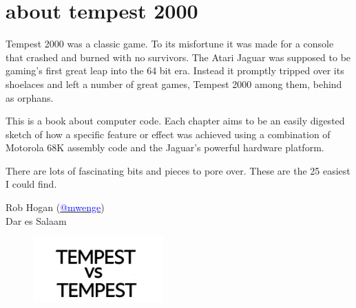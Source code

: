\chapter*{about tempest 2000} 
Tempest 2000 was a classic game. To its misfortune it was made for a console that crashed and burned with no
survivors. The Atari Jaguar was supposed to be gaming's first great leap into the 64 bit era. Instead it 
promptly tripped over its shoelaces and left a number of great games, Tempest 2000 among them, behind
as orphans.

This is a book about computer code. Each chapter aims to be an easily digested sketch of how
a specific feature or effect was achieved using a combination of Motorola 68K assembly code and
the Jaguar's powerful hardware platform.

There are lots of fascinating bits and pieces to pore over. These are the 25 easiest I could find.

Rob Hogan (\href{https://mastodon.social/@mwenge}{\textcolor{blue}{@mwenge}})\\
Dar es Salaam \the\year{} \\
\thispagestyle{empty}%
\clearpage
\blankpage
\clearpage
\vspace*{\fill}
\begin{figure}[H]
    \centering
      \includegraphics[width=5cm]{src/cover/title_page.png}%
\end{figure}
\vspace*{\fill}
\thispagestyle{empty}%
\blankpage
\clearpage

